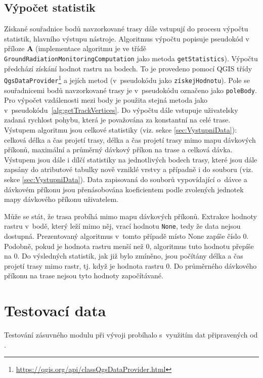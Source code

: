 \subsection{Výpočet statistik}
\label{subsec:vypocetStatistik} Získané souřadnice bodů navzorkované
trasy dále vstupují do procesu výpočtu statistik, hlavního výstupu
nástroje. Algoritmus výpočtu popisuje pseudokód v příloze \textbf{A} 
(implementace algoritmu je ve třídě \texttt{GroundRadiationMonitoringComputation} jako metoda
\texttt{getStatistics}). Výpočtu předchází získání hodnot rastru na
bodech. To je provedeno pomocí QGIS třídy
\texttt{QgsDataProvider}\footnote{\url{https://qgis.org/api/classQgsDataProvider.html}}
a jejích metod (v~pseudokódu jako \texttt{získejHodnotu}). Pole se
souřadnicemi bodů navzorkované trasy je v~pseudokódu označeno jako
\texttt{poleBody}. Pro výpočet vzdálenosti mezi body je použita stejná
metoda jako v~pseudokódu~\ref{alg:getTrackVertices}. Do výpočtu dále
vstupuje uživatelsky zadaná rychlost pohybu, která je považována za
konstantní na celé trase. Výstupem algoritmu jsou celkové statistiky
(viz. sekce \ref{sec:VystupniData}): celková délka a čas projetí
trasy, délka a čas projetí trasy mimo mapu dávkových příkonů,
maximální a průměrný dávkový příkon na trase a celková dávka. Výstupem
jsou dále i dílčí statistiky na jednotlivých bodech trasy, které jsou
dále zapsány do atributové tabulky nově vzniklé vrstvy a případně i do
 souboru (viz. sekce \ref{sec:VystupniData}). Data zapisovaná
do souborů vypovídající o~dávce a dávkovém příkonu jsou přenásobována
koeficientem podle zvolených jednotek mapy dávkového příkonu
uživatelem.




Může se stát, že trasa probíhá mimo mapu dávkových příkonů. Extrakce
hodnoty rastru v~bodě, který leží mimo něj, vrací hodnotu
\texttt{None}, tedy že data nejsou dostupná. Prezentovaný algoritmus
v~tomto případě místo None zapíše číslo 0. Podobně, pokud je hodnota
rastru menší než 0, algoritmus tuto hodnotu přepíše na 0. Do
výsledných statistik, jak již bylo zmíněno, jsou počítány délka a čas
projetí trasy mimo rastr, tj. když je hodnota rastru 0. Do průměrného
dávkového příkonu na trase nejsou tyto hodnoty započítávané.



\section{Testovací data} Testování zásuvného modulu při vývoji
probíhalo s~využitím dat připravených od .

